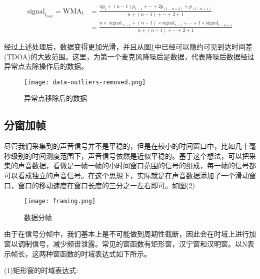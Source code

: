 \documentclass[winfonts]{njuthesis}
\begin{document}
			\begin{equation}
			\begin{aligned}
				\text{signal}_{t_{new}} = \text{WMA}_{t}&=\frac{n p_{t}+(n-1) p_{t-1}+\cdots+2 p_{(t-n+2)}+p_{(t-n+1)}}{n+(n-1)+\cdots+2+1}\\
											  &=\frac{n \times \text { signal }_{t-1}+(n-1) \times \text {signal}_{t-1}+\cdots+1 \times \text {signal}_{t-n+1}}{n+(n-1)+\cdots+2+1}								 
			\end{aligned}
			\end{equation}
			
			经过上述处理后，数据变得更加光滑，并且从图\ref{fig: data-outliers-removed}中已经可以隐约可见到达时间差(TDOA)的大致范围。这里，为第一个麦克风降噪后是数据，代表降噪后数据经过异常点去除操作后的数据。
			
			\begin{figure}[H]
				\centering
				\texttt{[image: data-outliers-removed.png]} 
				\caption{异常点移除后的数据}
				\label{fig: data-outliers-removed}
			\end{figure}
		
		\subsection{分窗加帧}
		
			尽管我们采集到的声音信号并不是平稳的，但是在较小的时间窗口中，比如几十毫秒级别的时间测度范围下，声音信号依然是近似平稳的。基于这个想法，可以把采集的声音数据，看做是一帧一帧的小时间窗口范围的信号的组成，每一帧的信号都可以看成独立的声音信号。在这个思想下，实际就是在声音数据添加了一个滑动窗口，窗口的移动速度在窗口长度的三分之一左右即可。如图(\ref{fig: framing})
					
			\begin{figure}[H]
				\centering
				\texttt{[image: framing.png]} 
				\caption{数据分帧}
				\label{fig: framing}
			\end{figure}
		
			由于在信号分帧中，我们基本上是不可能做到周期性截断，因此会在时域上进行加窗以调制信号，减少频谱泄露。常见的窗函数有矩形窗，汉宁窗和汉明窗\cite{Window_function}。以N表示帧长，这两种窗函数的时域表达式如下所示。
			
			(1)矩形窗的时域表达式:
			
\end{document}
